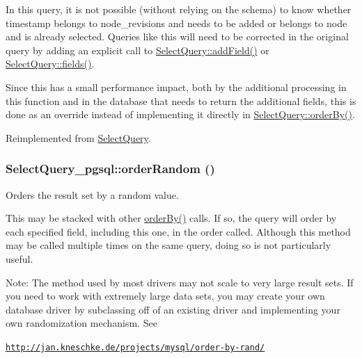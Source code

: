 

In this query, it is not possible (without relying on the schema) to know whether timestamp belongs to node\_\-revisions and needs to be added or belongs to node and is already selected. Queries like this will need to be corrected in the original query by adding an explicit call to \hyperlink{classSelectQuery_a8f5cef012b0f3111a5e6b8bcc47bacea}{SelectQuery::addField()} or \hyperlink{classSelectQuery_ab240a4ee46566adaff68b364c7c60699}{SelectQuery::fields()}.

Since this has a small performance impact, both by the additional processing in this function and in the database that needs to return the additional fields, this is done as an override instead of implementing it directly in \hyperlink{classSelectQuery_a32ede93f2abfd7f8bc388d0c00512fae}{SelectQuery::orderBy()}. 

Reimplemented from \hyperlink{classSelectQuery_a32ede93f2abfd7f8bc388d0c00512fae}{SelectQuery}.\hypertarget{classSelectQuery__pgsql_a2aac16a64fec955bf8313aabdcad0fec}{
\subsubsection[{orderRandom}]{\setlength{\rightskip}{0pt plus 5cm}SelectQuery\_\-pgsql::orderRandom ()}}
\label{classSelectQuery__pgsql_a2aac16a64fec955bf8313aabdcad0fec}
Orders the result set by a random value.

This may be stacked with other \hyperlink{classSelectQuery__pgsql_adb1134a3498b05b32a33787418d68f8c}{orderBy()} calls. If so, the query will order by each specified field, including this one, in the order called. Although this method may be called multiple times on the same query, doing so is not particularly useful.

Note: The method used by most drivers may not scale to very large result sets. If you need to work with extremely large data sets, you may create your own database driver by subclassing off of an existing driver and implementing your own randomization mechanism. See

\href{http://jan.kneschke.de/projects/mysql/order-by-rand/}{\tt http://jan.kneschke.de/projects/mysql/order-\/by-\/rand/}

